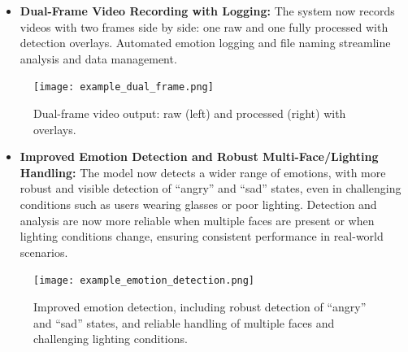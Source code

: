 \documentclass[12pt]{article}
\begin{document}
\begin{itemize}
    \item \textbf{Dual-Frame Video Recording with Logging:} The system now records videos with two frames side by side: one raw and one fully processed with detection overlays. Automated emotion logging and file naming streamline analysis and data management.
\end{itemize}
\begin{figure}[h!]
    \centering
    \texttt{[image: example\_dual\_frame.png]}
    \caption{Dual-frame video output: raw (left) and processed (right) with overlays.}
\end{figure}

\begin{itemize}
    \item \textbf{Improved Emotion Detection and Robust Multi-Face/Lighting Handling:} The model now detects a wider range of emotions, with more robust and visible detection of ``angry'' and ``sad'' states, even in challenging conditions such as users wearing glasses or poor lighting. Detection and analysis are now more reliable when multiple faces are present or when lighting conditions change, ensuring consistent performance in real-world scenarios.
\end{itemize}
\begin{figure}[h!]
    \centering
    \texttt{[image: example\_emotion\_detection.png]}
    \caption{Improved emotion detection, including robust detection of ``angry'' and ``sad'' states, and reliable handling of multiple faces and challenging lighting conditions.}
\end{figure}

\end{document}
